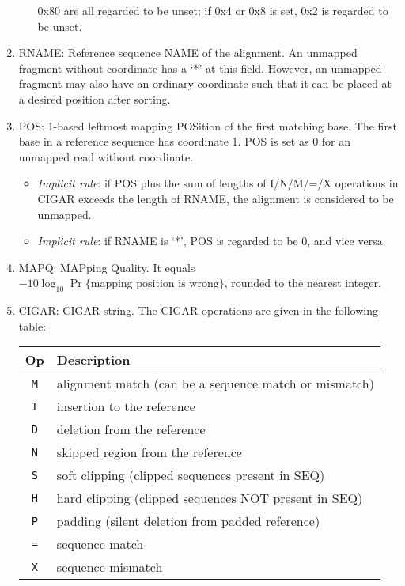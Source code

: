 \documentclass[10pt]{article}
\begin{document}
\begin{enumerate}
\begin{itemize}
    0x80 are all regarded to be unset; if 0x4 or 0x8 is set, 0x2 is
    regarded to be unset.
  \end{itemize}
\item {\sf RNAME}: Reference sequence NAME of the alignment. An unmapped
  fragment without coordinate has a `*' at this field. However, an
  unmapped fragment may also have an ordinary coordinate such that it
  can be placed at a desired position after sorting.
\item {\sf POS}: 1-based leftmost mapping POSition of the first matching
  base. The first base in a reference sequence has coordinate 1. {\sf
    POS} is set as 0 for an unmapped read without
  coordinate.
  \begin{itemize}
  \item \emph{Implicit rule}: if {\sf POS} plus the sum of lengths
    of I/N/M/=/X operations in {\sf CIGAR} exceeds the length of {\sf
      RNAME}, the alignment is considered to be unmapped.
  \item \emph{Implicit rule}: if {\sf RNAME} is `*', {\sf POS} is
    regarded to be 0, and vice versa.
  \end{itemize}
\item {\sf MAPQ}: MAPping Quality. It equals
  $-10\log_{10}\Pr\{\mbox{mapping position is wrong}\}$, rounded to the
  nearest integer.
\item {\sf CIGAR}: CIGAR string. The CIGAR operations are given in the
  following table:
  \begin{center}\small
  \begin{tabular}{cl}
  \hline
  Op & Description\\
  \hline
  {\tt M} & alignment match (can be a sequence match or mismatch)\\
  {\tt I} & insertion to the reference \\
  {\tt D} & deletion from the reference \\
  {\tt N} & skipped region from the reference \\
  {\tt S} & soft clipping (clipped sequences present in {\sf SEQ})\\
  {\tt H} & hard clipping (clipped sequences NOT present in {\sf SEQ})\\
  {\tt P} & padding (silent deletion from padded reference)\\
  {\tt =} & sequence match \\
  {\tt X} & sequence mismatch \\
  \hline
  \end{tabular}
  \end{center}

\end{enumerate}
\end{document}
